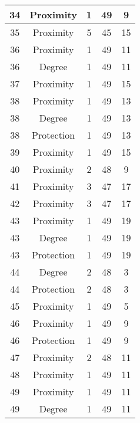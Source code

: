 \documentclass[results.tex]{subfiles}
\begin{document}
\begin{center}
\begin{tabular}{| c || c | c | c | c |}
    34 & Proximity & 1 & 49 & 9 \\ 
    \hline
    35 & Proximity & 5 & 45 & 15 \\ 
    \hline
    36 & Proximity & 1 & 49 & 11 \\ 
    \hline
    36 & Degree & 1 & 49 & 11 \\ 
    \hline
    37 & Proximity & 1 & 49 & 15 \\ 
    \hline
    38 & Proximity & 1 & 49 & 13 \\ 
    \hline
    38 & Degree & 1 & 49 & 13 \\ 
    \hline
    38 & Protection & 1 & 49 & 13 \\ 
    \hline
    39 & Proximity & 1 & 49 & 15 \\ 
    \hline
    40 & Proximity & 2 & 48 & 9 \\ 
    \hline
    41 & Proximity & 3 & 47 & 17 \\ 
    \hline
    42 & Proximity & 3 & 47 & 17 \\ 
    \hline
    43 & Proximity & 1 & 49 & 19 \\ 
    \hline
    43 & Degree & 1 & 49 & 19 \\ 
    \hline
    43 & Protection & 1 & 49 & 19 \\ 
    \hline
    44 & Degree & 2 & 48 & 3 \\ 
    \hline
    44 & Protection & 2 & 48 & 3 \\ 
    \hline
    45 & Proximity & 1 & 49 & 5 \\ 
    \hline
    46 & Proximity & 1 & 49 & 9 \\ 
    \hline
    46 & Protection & 1 & 49 & 9 \\ 
    \hline
    47 & Proximity & 2 & 48 & 11 \\ 
    \hline
    48 & Proximity & 1 & 49 & 11 \\ 
    \hline
    49 & Proximity & 1 & 49 & 11 \\ 
    \hline
    49 & Degree & 1 & 49 & 11 \\ 
    \hline   \end{tabular}
\end{center}
\end{document}
